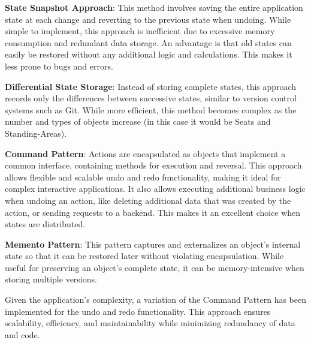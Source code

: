 \begin{compactenum}
\item \textbf{State Snapshot Approach}: This method involves saving the entire application state at each change and reverting to the previous state when undoing. While simple to implement, this approach is inefficient due to excessive memory consumption and redundant data storage. An advantage is that old states can easily be restored without any additional logic and calculations. This makes it less prone to bugs and errors.
\item \textbf{Differential State Storage}: Instead of storing complete states, this approach records only the differences between successive states, similar to version control systems such as Git. While more efficient, this method becomes complex as the number and types of objects increase (in this case it would be Seats and Standing-Areas).
\item \textbf{Command Pattern}: Actions are encapsulated as objects that implement a common interface, containing methods for execution and reversal. This approach allows flexible and scalable undo and redo functionality, making it ideal for complex interactive applications. It also allows executing additional business logic when undoing an action, like deleting additional data that was created by the action, or sending requests to a backend. This makes it an excellent choice when states are distributed.
\item \textbf{Memento Pattern}: This pattern captures and externalizes an object's internal state so that it can be restored later without violating encapsulation. While useful for preserving an object's complete state, it can be memory-intensive when storing multiple versions.
\end{compactenum}

Given the application's complexity, a variation of the Command Pattern has been implemented for the undo and redo functionality. This approach ensures scalability, efficiency, and maintainability while minimizing redundancy of data and code.


